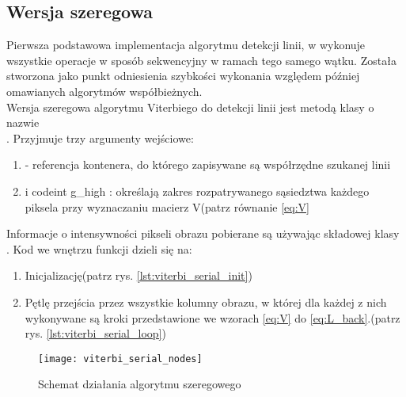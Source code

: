 \documentclass[document.tex]{subfiles}
\begin{document}
\subsection{Wersja szeregowa}
\indent Pierwsza podstawowa implementacja algorytmu detekcji linii, w wykonuje wszystkie operacje w sposób sekwencyjny  w ramach tego samego wątku. Została stworzona jako punkt odniesienia szybkości wykonania względem później omawianych algorytmów współbieżnych.
\\
\indent Wersja szeregowa algorytmu Viterbiego do detekcji linii jest metodą klasy  o nazwie
\\ . Przyjmuje trzy argumenty wejściowe:
\begin{enumerate}
    \item {} - referencja kontenera, do którego zapisywane są współrzędne szukanej linii
    \item {} i code{int g\_high} : określają zakres rozpatrywanego sąsiedztwa każdego piksela przy
    wyznaczaniu macierz V(patrz równanie \ref{eq:V}
\end{enumerate}
Informacje o intensywności pikseli obrazu pobierane są używając składowej klasy  .
\clearpage
Kod we wnętrzu funkcji dzieli się na:
\begin{enumerate}
    \item Inicjalizację(patrz rys. \ref{lst:viterbi_serial_init})
    \item Pętlę przejścia przez wszystkie kolumny obrazu, w której dla każdej z nich wykonywane są kroki przedstawione we wzorach \ref{eq:V} do \ref{eq:L_back}.(patrz rys. \ref{lst:viterbi_serial_loop})
\end{enumerate}

 

 

\begin{figure}[h]
\texttt{[image: viterbi\_serial\_nodes]}
\caption{Schemat działania algorytmu szeregowego}
\label{fig:viterbi_serial_nodes}
\end{figure}
\end{document}
